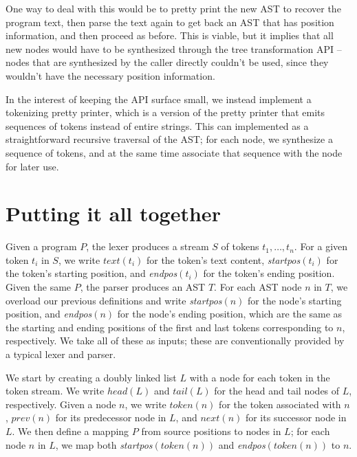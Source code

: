 One way to deal with this would be to pretty print the new AST to recover the
program text, then parse the text again to get back an AST that has position
information, and then proceed as before. This is viable, but it implies that
all new nodes would have to be synthesized through the tree transformation API
-- nodes that are synthesized by the caller directly couldn't be used, since
they wouldn't have the necessary position information.

In the interest of keeping the API surface small, we instead implement a
tokenizing pretty printer, which is a version of the pretty printer that emits
sequences of tokens instead of entire strings. This can implemented as a
straightforward recursive traversal of the AST; for each node, we synthesize a
sequence of tokens, and at the same time associate that sequence with the node
for later use.

\section{Putting it all together}

Given a program $P$, the lexer produces a stream $S$ of tokens $t_1, \dots,
t_n$. For a given token $t_i$ in $S$, we write $text(t_i)$ for the token's text
content, \emph{startpos}$(t_i)$ for the token's starting position, and
\emph{endpos}$(t_i)$ for the token's ending position. Given the same $P$, the
parser produces an AST $T$. For each AST node $n$ in $T$, we overload our
previous definitions and write \emph{startpos}$(n)$ for the node's starting position,
and \emph{endpos}$(n)$ for the node's ending position, which are the same as the
starting and ending positions of the first and last tokens corresponding to $n$,
respectively. We take all of these as inputs; these are conventionally provided
by a typical lexer and parser.

We start by creating a doubly linked list $L$ with a node for each token in the
token stream. We write $head(L)$ and $tail(L)$ for the head and tail nodes of
$L$, respectively. Given a node $n$, we write $token(n)$ for the token
associated with $n$, $prev(n)$ for its predecessor node in $L$, and $next(n)$
for its successor node in $L$. We then define a mapping $P$ from source
positions to nodes in $L$; for each node $n$ in $L$, we map both
\emph{startpos}$(token(n))$ and \emph{endpos}$(token(n))$ to $n$.


